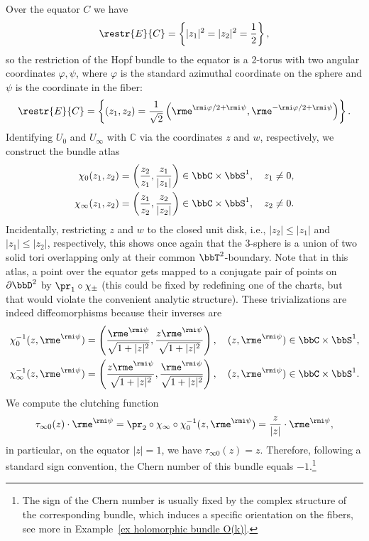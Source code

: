 \begin{example}
    Over the equator $C$ we have 
    \[\restr{E}{C}=\left\{|z_1|^2=|z_2|^2=\frac12\right\},\]
    so the restriction of the Hopf bundle to the equator is a 2-torus with two angular coordinates $\varphi,\psi$, where $\varphi$ is the standard azimuthal coordinate on the sphere and $\psi$ is the coordinate in the fiber:
    \[\restr{E}{C}=\left\{(z_1,z_2)=\frac{1}{\sqrt{2}}\left(\rme^{\rmi\varphi/2+\rmi\psi},\rme^{-\rmi\varphi/2+\rmi\psi}\right)\right\}.\]
    Identifying $U_0$ and $U_\infty$ with $\mathbb{C}$ via the coordinates $z$ and $w$, respectively, we construct the bundle atlas
    \begin{align}
        \chi_0(z_1,z_2)=\left(\frac{z_2}{z_1},\frac{z_1}{|z_1|}\right)\in \bbC\times \bbS^1,\quad z_1\neq 0,\\
        \chi_\infty(z_1,z_2)=\left(\frac{z_1}{z_2},\frac{z_2}{|z_2|}\right)\in \bbC\times \bbS^1,\quad z_2\neq 0.
    \end{align}
    Incidentally, restricting $z$ and $w$ to the closed unit disk, i.e., $|z_2|\leq|z_1|$ and $|z_1|\leq|z_2|$, respectively, this shows once again that the 3-sphere is a union of two solid tori overlapping only at their common $\bbT^2$-boundary. Note that in this atlas, a point over the equator gets mapped to a conjugate pair of points on $\partial\bbD^2$ by $\pr_1\circ \chi_\pm$ (this could be fixed by redefining one of the charts, but that would violate the convenient analytic structure). These trivializations are indeed diffeomorphisms because their inverses are
    \begin{align}
        \chi_0^{-1}(z,\rme^{\rmi\psi})=\left(\frac{\rme^{\rmi\psi}}{{\sqrt{1+|z|^2}}},\frac{z\rme^{\rmi\psi}}{{\sqrt{1+|z|^2}}}\right),\quad (z,\rme^{\rmi\psi})\in \bbC\times \bbS^1,\\
        \chi_\infty^{-1}(z,\rme^{\rmi\psi})=\left(\frac{z\rme^{\rmi\psi}}{{\sqrt{1+|z|^2}}},\frac{\rme^{\rmi\psi}}{{\sqrt{1+|z|^2}}}\right),\quad (z,\rme^{\rmi\psi})\in \bbC\times \bbS^1.
    \end{align}
    We compute the clutching function
    \[\tau_{\infty0}(z)\cdot \rme^{\rmi\psi}=\pr_2\circ \chi_\infty\circ \chi_0^{-1}(z,\rme^{\rmi\psi})=\frac{z}{|z|}\cdot \rme^{\rmi\psi},\]
    in particular, on the equator $|z|=1$, we have $\tau_{\infty0}(z)=z$. Therefore, following a standard sign convention, the Chern number of this bundle equals $-1$.\footnote{The sign of the Chern number is usually fixed by the complex structure of the corresponding bundle, which induces a specific orientation on the fibers, see more in Example~\ref{ex holomorphic bundle O(k)}.}
\end{example}


